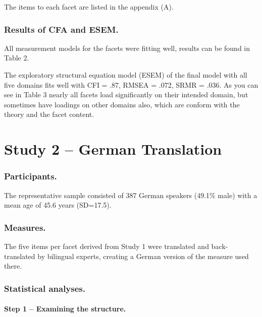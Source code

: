 \documentclass[,man]{apa6}
\let\oldparagraph\paragraph
\renewcommand{\paragraph}[1]{\oldparagraph{#1}\mbox{}}
\theoremstyle{definition}
\theoremstyle{definition}
\theoremstyle{definition}
\theoremstyle{remark}
\begin{document}
The items to each facet are listed in the appendix (A).

\hypertarget{results-of-cfa-and-esem.}{%
\subsubsection{Results of CFA and
ESEM.}\label{results-of-cfa-and-esem.}}

All measurement models for the facets were fitting well, results can be
found in Table 2.

The exploratory structural equation model (ESEM) of the final model with
all five domains fits well with CFI = .87, RMSEA = .072, SRMR = .036. As
you can see in Table 3 nearly all facets load significantly on their
intended domain, but sometimes have loadings on other domains also,
which are conform with the theory and the facet content.

\hypertarget{study-2-german-translation}{%
\section{Study 2 -- German
Translation}\label{study-2-german-translation}}

\hypertarget{participants.}{%
\subsubsection{Participants.}\label{participants.}}

The representative sample consisted of 387 German speakers (49.1\% male)
with a mean age of 45.6 years (SD=17.5).

\hypertarget{measures.-1}{%
\subsubsection{Measures.}\label{measures.-1}}

The five items per facet derived from Study 1 were translated and
back-translated by bilingual experts, creating a German version of the
measure used there.

\hypertarget{statistical-analyses.-1}{%
\subsubsection{Statistical analyses.}\label{statistical-analyses.-1}}

\hypertarget{step-1-examining-the-structure.}{%
\paragraph{Step 1 -- Examining the
structure.}\label{step-1-examining-the-structure.}}
\end{document}
